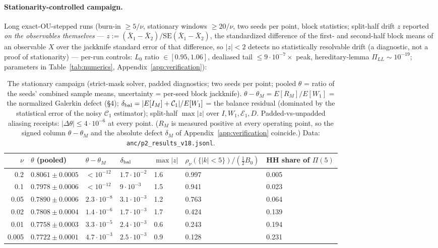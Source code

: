 \documentclass[11pt]{article}
\theoremstyle{remark}
\theoremstyle{plain}
\newcommand{\eqdef}{:=}
\begin{document}
\paragraph{Stationarity-controlled campaign.} Long exact-OU-stepped runs (burn-in $\ge 5/\nu$, stationary windows
$\ge 20/\nu$, two seeds per point, block statistics; split-half drift $z$
reported \emph{on the observables themselves} --- $z \eqdef (\bar X_1 - \bar X_2)/\mathrm{SE}(\bar X_1 - \bar X_2)$,
the standardized difference of the first- and second-half block means of an observable $X$ over the
jackknife standard error of that difference, so $|z| < 2$ detects no statistically resolvable drift (a diagnostic, not a proof of stationarity) --- per-run controls: $L_0$ ratio
$\in [0.95, 1.06]$, dealiased tail $\le 9\cdot10^{-7}\times$ peak, hereditary-lemma
$\Pi_{LL} \sim 10^{-19}$; parameters in Table~\ref{tab:numerics}, Appendix~\ref{app:verification}):
\begin{table}[htbp]
\centering\small
\caption{The stationary campaign (strict-mask solver, padded diagnostics; two seeds per
point; pooled $\theta$ = ratio of the seeds' combined sample means, uncertainty =
per-seed block jackknife). $\theta - \theta_M = E[R_M]/E[W_1]$ = the normalized Galerkin
defect (\S4); $\delta_{\rm bal} = |E[I_M]+\mathcal{C}_1|/E[W_1]$ = the balance residual
(dominated by the statistical error of the noisy $\mathcal{C}_1$ estimator);
split-half $\max|z|$ over $I, W_1, \mathcal{E}_1, D$. Padded-vs-unpadded aliasing
receipts: $|\Delta\theta| \le 4\cdot10^{-6}$ at every point. ($R_M$ is measured
positive at every operating point, so the signed column $\theta-\theta_M$ and the
absolute defect $\delta_M$ of Appendix~\ref{app:verification} coincide.) Data:
\texttt{anc/p2\_results\_v18.jsonl}.}
\label{tab:campaign17}
\begin{tabular}{r|llllll}
$\nu$ & $\theta$ (pooled) & $\theta - \theta_M$ & $\delta_{\rm bal}$ & $\max|z|$ & $\rho_\nu(\{|k|<5\})/(\tfrac12 B_0)$ & HH share of $\Pi(5)$ \\
\hline
0.2   & $0.8061 \pm 0.0005$ & $<10^{-12}$ & $1.7\cdot10^{-2}$ & 1.6 & 0.997 & 0.005 \\
0.1   & $0.7978 \pm 0.0006$ & $<10^{-12}$ & $9\cdot10^{-3}$ & 1.5 & 0.941 & 0.023 \\
0.05   & $0.7890 \pm 0.0006$ & $2.3\cdot10^{-8}$ & $3.1\cdot10^{-3}$ & 1.2 & 0.763 & 0.064 \\
0.02   & $0.7808 \pm 0.0004$ & $1.4\cdot10^{-6}$ & $1.7\cdot10^{-3}$ & 1.7 & 0.424 & 0.139 \\
0.01   & $0.7758 \pm 0.0003$ & $3.3\cdot10^{-5}$ & $2.4\cdot10^{-3}$ & 0.6 & 0.243 & 0.194 \\
0.005   & $0.7722 \pm 0.0001$ & $4.7\cdot10^{-3}$ & $2.5\cdot10^{-3}$ & 0.9 & 0.128 & 0.231 \\
\hline
\end{tabular}
\end{table}
\end{document}
